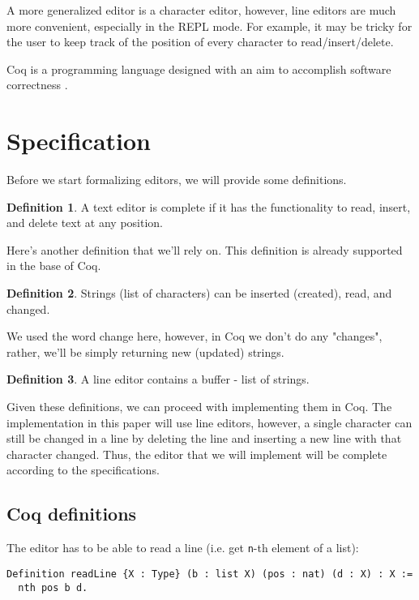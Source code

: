 \documentclass{article}
\theoremstyle{definition}
\newtheorem{definition}{Definition}[section]
\begin{document}
A more generalized editor is a character editor, however, line editors are much more convenient, especially in the REPL mode. For example, it may be tricky for the user to keep track of the position of every character to read/insert/delete.

Coq is a programming language designed with an aim to accomplish software correctness \cite{b2}.

\section{Specification}

Before we start formalizing editors, we will provide some definitions.

\theoremstyle{definition}
\begin{definition}
A text editor is complete if it has the functionality to read, insert, and delete text at any position.
\end{definition}

Here's another definition that we'll rely on. This definition is already supported in the base of Coq.

\theoremstyle{definition}
\begin{definition}
Strings (list of characters) can be inserted (created), read, and changed.
\end{definition}

We used the word change here, however, in Coq we don't do any "changes", rather, we'll be simply returning new (updated) strings.

\theoremstyle{definition}
\begin{definition}
A line editor contains a buffer - list of strings.
\end{definition}

Given these definitions, we can proceed with implementing them in Coq. The implementation in this paper will use line editors, however, a single character can still be changed in a line by deleting the line and inserting a new line with that character changed. Thus, the editor that we will implement will be complete according to the specifications.

\subsection{Coq definitions}

The editor has to be able to read a line (i.e. get \texttt{n}-th element of a list):

\begin{lstlisting}
Definition readLine {X : Type} (b : list X) (pos : nat) (d : X) : X :=
  nth pos b d.
\end{lstlisting}
\end{document}
